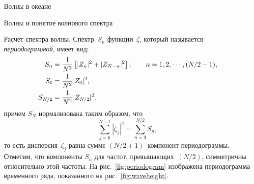 \begin{chapter}{Волны в океане}
\begin{section}{Волны и понятие волнового спектра}
\begin{paragraph}{Расчет спектра волны.}
Спектр~$S_{n}$ функции~$\zeta$, который называется
\emph{периодограммой},
имеет вид:
\begin{align}
S_{n}   &= \frac{1}{N^{2}} \left[ |Z_{n}|^{2} + |Z_{N-n}|^{2} \right] ; 
           \qquad n = 1, 2, \cdots , ( N/2 - 1 ), \\
S_{0}   &= \frac{1}{N^{2}} |Z_{0}|^{2}, \notag \\
S_{N/2} &= \frac{1}{N^{2}} |Z_{N/2}|^{2}, \notag
\end{align}
причем $S_{N}$ нормализована таким образом, что
\begin{equation}
 \sum_{j=0}^{N-1} |\zeta_{j}|^2 = \sum_{n=0}^{N/2} S_{n},
\end{equation}
то есть дисперсия~$\zeta_{j}$ равна сумме $(N/2 + 1)$~компонент периодограммы.
Отметим, что компоненты $S_{n}$ для частот, превышающих~$(N/2)$, симметричны
относительно этой частоты. На рис.~\ref{fig:periodogram} изображена 
периодограмма временного ряда, показанного на рис.~\ref{fig:waveheight}.
%


\end{paragraph}
\end{section}
\end{chapter}
